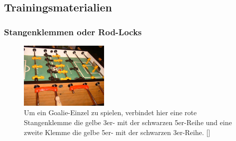 \subsection{Trainingsmaterialien}
\label{tisch:zubehoer:training}

\subsubsection{Stangenklemmen oder Rod-Locks}
\label{tisch:zubehoer:training:rodlock}

\begin{figure}
\centering 
\includegraphics[width=0.38\textwidth]{img/rodlock_goalie.jpg} 
\caption{Um ein Goalie-Einzel zu spielen, verbindet hier eine rote Stangenklemme die gelbe 3er- mit der schwarzen 5er-Reihe und eine zweite Klemme die gelbe 5er- mit der schwarzen 3er-Reihe. [\cite{www:rod-lock}]} 
\label{fig:rod-lock} 
\end{figure}

